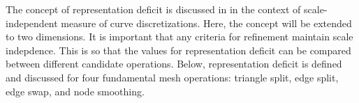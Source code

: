 The concept of representation deficit is discussed in \cite{mclaurin13}
in the context of scale-independent measure of curve discretizations.
Here, the concept will be extended to two dimensions. It is important
that any criteria for refinement maintain scale indepdence. This is so
that the values for representation deficit can be compared between
different candidate operations. Below, representation deficit is defined
and discussed for four fundamental mesh operations: triangle split, edge
split, edge swap, and node smoothing.
